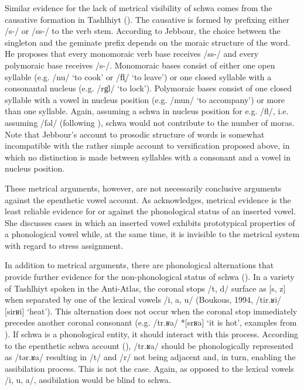 Similar evidence for the lack of metrical visibility of schwa comes from the causative formation in Tashlhiyt (\citealt{Jebbour1996,Jebbour1999}). The causative is formed by prefixing either /s-/ or /ss-/ to the verb stem. According to Jebbour, the choice between the singleton and the geminate prefix depends on the moraic structure of the word. He proposes that every monomoraic verb base receives /ss-/ and every polymoraic base receives /s-/. Monomoraic bases consist of either one open syllable (e.g. /nu/ ‘to cook’ or /fl̩/ ‘to leave’) or one closed syllable with a consonantal nucleus (e.g. /rg̍l/ ‘to lock’). Polymoraic bases consist of one closed syllable with a vowel in nucleus position (e.g. /mun/ ‘to accompany’) or more than one syllable. Again, assuming a schwa in nucleus position for e.g. /fl/, i.e. assuming /fəl/ (following \citealt{Coleman2001}), schwa would not contribute to the number of moras. Note that Jebbour’s account to prosodic structure of words is somewhat incompatible with the rather simple account to versification proposed above, in which no distinction is made between syllables with a consonant and a vowel in nucleus position. 

These metrical arguments, however, are not necessarily conclusive arguments against the epenthetic vowel account. As \citet[397]{Hall2006} acknowledges, metrical evidence is the least reliable evidence for or against the phonological status of an inserted vowel. She discusses cases in which an inserted vowel exhibits prototypical properties of a phonological vowel while, at the same time, it is invisible to the metrical system with regard to stress assignment.

In addition to metrical arguments, there are phonological alternations that provide further evidence for the non-phonological status of schwa (\citealt{Ridouane2008}). In a variety of Tashlhiyt spoken in the Anti-Atlas, the coronal stops /t, d/ surface as [s, z] when separated by one of the lexical vowels /i, a, u/ (Boukous, 1994, /tir.ʁi/  [sirʁi] ‘heat’). This alternation does not occur when the coronal stop immediately precedes another coronal consonant (e.g. /tr.ʁa/  *[srʁa] ‘it is hot’, examples from \citealt[352f.]{Ridouane2008}). If schwa is a phonological entity, it should interact with this process. According to the epenthetic schwa account (\citealt{Coleman2001}), /tr.ʁa/ should be phonologically represented as /tər.ʁa/ resulting in /t/ and /r/ not being adjacent and, in turn, enabling the assibilation process. This is not the case. Again, as opposed to the lexical vowels /i, u, a/, assibilation would be blind to schwa. 

